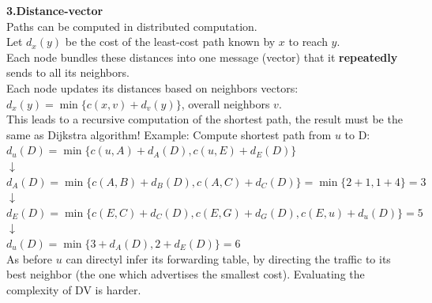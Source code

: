 \documentclass[a4paper, fontsize=8pt, landscape, DIV=1]{scrartcl}
\begin{document}
\begin{multicols*}{4}
		    \textbf{3.Distance-vector}\\
		    Paths can be computed in distributed computation.\\
		    Let $d_x(y)$ be the cost of the least-cost path known by $x$ to reach $y$. \\
		    Each node bundles these distances into one message (vector) that it \textbf{repeatedly} sends to all its neighbors. \\
		    Each node updates its distances based on neighbors vectors:\\
		    $d_x(y)=\min\{c(x,v)+d_v(y)\}$, overall neighbors $v$.\\
		    This leads to a recursive computation of the shortest path, the result must be the same as Dijkstra algorithm! 
		    Example: Compute shortest path from $u$ to D:\\
		    $d_u(D)=\min\{c(u,A)+d_A(D), c(u,E)+d_E(D)\}$\\
		    $\downarrow$\\
		    $d_A(D)=\min\{c(A,B)+d_B(D), c(A,C)+d_C(D)\}=\min\{2+1,1+4\}=3$\\
		    $\downarrow$\\
		    $d_E(D)=\min\{c(E,C)+d_C(D), c(E,G)+d_G(D),c(E,u)+d_u(D)\}=5$\\
		    $\downarrow$\\
		    $d_u(D)=\min\{3+d_A(D), 2+d_E(D)\}=6$\\
		    As before $u$ can directyl infer its forwarding table, by directing the traffic to its best neighbor (the one which advertises the smallest cost). Evaluating the complexity of DV is harder. 
		    

\end{multicols*}
\end{document}
